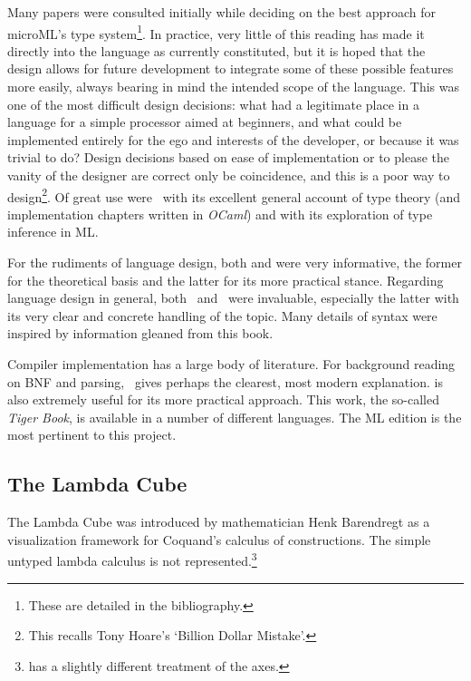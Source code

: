 \documentclass[12pt, a4paper]{report}
\begin{document}
Many papers were consulted initially while deciding on the best approach for microML's type
system\footnote{These are detailed in the bibliography.}. In practice, very little of this
reading has made it directly into the language as currently constituted, but it is hoped that the
design allows for future development to integrate some of these possible features more easily,
always bearing in mind the intended scope of the language. This was one of the most difficult
design decisions: what had a legitimate place in a language for a simple processor aimed at
beginners, and what could be implemented entirely for the ego and interests of the developer, or because it
was trivial to do? Design decisions based on ease of implementation or to please the vanity of the
designer are correct only be coincidence, and this is a poor way to design\footnote{This recalls
Tony Hoare's `Billion Dollar Mistake'.}. Of great use were~\cite{Pierce:2002:TPL:509043} with its
excellent general account of type theory (and implementation chapters written in \textit{OCaml})
and\@\cite{Pierce:2004:ATT:1076265} with its exploration of type inference in ML\@.

For the rudiments of language design, both\@\cite{spj2} and\@\cite{spj1} were very informative, the
former for the theoretical basis and the latter for its more practical stance. Regarding language
design in general, both~\cite{Harper:2012:PFP:2431407} and~\cite{plp} were invaluable, especially
the latter with its very clear and concrete handling of the topic. Many details of syntax were
inspired by information gleaned from this book.

Compiler implementation has a large body of literature. For background reading on \gls{BNF} and
parsing,~\cite{torc} gives perhaps the clearest, most modern explanation.
\cite{Appel:1997:MCI:248430} is also extremely useful for its more practical approach. This work,
the so-called \textit{Tiger Book}, is available in a number of different languages. The ML edition is
the most pertinent to this project.

\subsection{The Lambda Cube}
The Lambda Cube was introduced by mathematician Henk Barendregt as a visualization framework for
Coquand's calculus of constructions\cite{Barendregt:1993:LCT:162552.162561}. The simple untyped lambda calculus is not
represented.\footnote{\cite{Pierce:2002:TPL:509043} has a slightly different treatment of the axes.}
\end{document}
